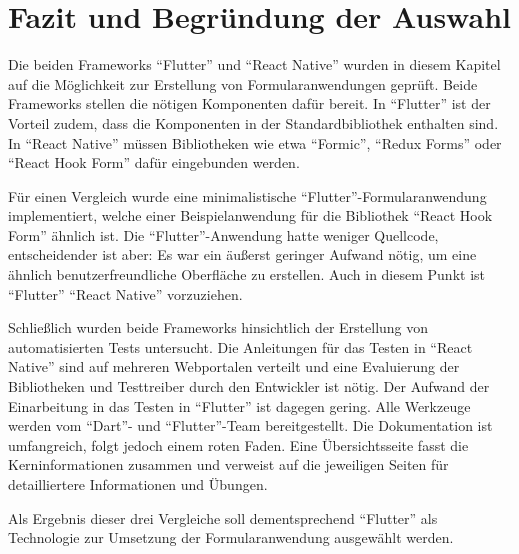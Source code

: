 \clearpage
\section{Fazit und Begründung der Auswahl}
\label{sec:Fazit-und-Begründung-der-Auswahl}



Die beiden Frameworks \enquote{Flutter} und \enquote{React Native} wurden in diesem Kapitel auf die Möglichkeit zur Erstellung von Formularanwendungen geprüft.
Beide Frameworks stellen die nötigen Komponenten dafür bereit.
In \enquote{Flutter} ist der Vorteil zudem, dass die Komponenten in der Standardbibliothek enthalten sind.
In \enquote{React Native} müssen Bibliotheken wie etwa \enquote{Formic}, \enquote{Redux Forms} oder \enquote{React Hook Form} dafür eingebunden werden.

Für einen Vergleich wurde eine minimalistische \enquote{Flutter}-Formularanwendung implementiert,
welche einer Beispielanwendung für die Bibliothek \enquote{React Hook Form} ähnlich ist.
Die \enquote{Flutter}-Anwendung hatte weniger Quellcode,
entscheidender ist aber: Es war ein äußerst geringer Aufwand nötig,
um eine ähnlich benutzerfreundliche Oberfläche zu erstellen.
Auch in diesem Punkt ist \enquote{Flutter} \enquote{React Native} vorzuziehen.

Schließlich wurden beide Frameworks hinsichtlich der Erstellung von automatisierten Tests untersucht.
Die Anleitungen für das Testen in \enquote{React Native} sind auf mehreren Webportalen verteilt und eine Evaluierung der Bibliotheken und Testtreiber durch den Entwickler ist nötig.
Der Aufwand der Einarbeitung in das Testen in \enquote{Flutter} ist dagegen  gering.
Alle Werkzeuge werden vom \enquote{Dart}- und \enquote{Flutter}-Team bereitgestellt.
Die Dokumentation ist umfangreich, folgt jedoch einem roten Faden.
Eine Übersichtsseite fasst die Kerninformationen zusammen und verweist auf die jeweiligen  Seiten für detailliertere Informationen und Übungen.

Als Ergebnis dieser drei Vergleiche soll dementsprechend \enquote{Flutter} als Technologie zur Umsetzung der Formularanwendung ausgewählt werden.
